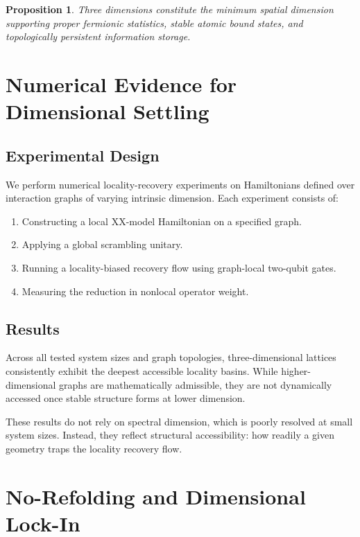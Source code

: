 \documentclass[11pt]{article}
\newtheorem{proposition}{Proposition}
\begin{document}
\begin{proposition}
Three dimensions constitute the minimum spatial dimension supporting proper fermionic statistics, stable atomic bound states, and topologically persistent information storage.
\end{proposition}

\section{Numerical Evidence for Dimensional Settling}

\subsection{Experimental Design}

We perform numerical locality-recovery experiments on Hamiltonians defined over interaction graphs of varying intrinsic dimension. Each experiment consists of:

\begin{enumerate}[label=\arabic*.]
\item Constructing a local XX-model Hamiltonian on a specified graph.
\item Applying a global scrambling unitary.
\item Running a locality-biased recovery flow using graph-local two-qubit gates.
\item Measuring the reduction in nonlocal operator weight.
\end{enumerate}

\subsection{Results}

Across all tested system sizes and graph topologies, three-dimensional lattices consistently exhibit the deepest accessible locality basins. While higher-dimensional graphs are mathematically admissible, they are not dynamically accessed once stable structure forms at lower dimension.

These results do not rely on spectral dimension, which is poorly resolved at small system sizes. Instead, they reflect structural accessibility: how readily a given geometry traps the locality recovery flow.

\section{No-Refolding and Dimensional Lock-In}
\end{document}
